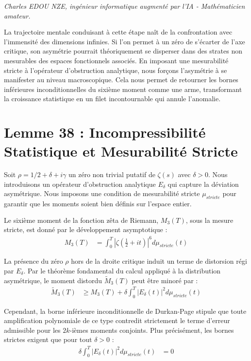\documentclass[
]{article}
\begin{document}
\vspace{1cm}
\begin{flushright}
\textit{Charles EDOU NZE, ingénieur informatique augmenté par l'IA - Mathématicien amateur.}
\end{flushright}


La trajectoire mentale conduisant à cette étape naît de la confrontation avec l'immensité des dimensions infinies. Si l'on permet à un zéro de s'écarter de l'axe critique, son asymétrie pourrait théoriquement se disperser dans des strates non mesurables des espaces fonctionnels associés. En imposant une mesurabilité stricte à l'opérateur d'obstruction analytique, nous forçons l'asymétrie à se manifester au niveau macroscopique. Cela nous permet de retourner les bornes inférieures inconditionnelles du sixième moment comme une arme, transformant la croissance statistique en un filet incontournable qui annule l'anomalie.

\section{Lemme 38 : Incompressibilité Statistique et Mesurabilité Stricte}

Soit $\rho = 1/2 + \delta + i\gamma$ un zéro non trivial putatif de $\zeta(s)$ avec $\delta > 0$. Nous introduisons un opérateur d'obstruction analytique $E_\delta$ qui capture la déviation asymétrique. Nous imposons une condition de mesurabilité stricte $\mu_{stricte}$ pour garantir que les moments soient bien définis sur l'espace entier.

Le sixième moment de la fonction zêta de Riemann, $M_3(T)$, sous la mesure stricte, est donné par le développement asymptotique :
\begin{align*}
    M_3(T) &= \int_0^T \left| \zeta\left(\frac{1}{2} + i t\right) \right|^6 d\mu_{stricte}(t)
\end{align*}

La présence du zéro $\rho$ hors de la droite critique induit un terme de distorsion régi par $E_\delta$. Par le théorème fondamental du calcul appliqué à la distribution asymétrique, le moment distordu $\tilde{M}_3(T)$ peut être minoré par :
\begin{align*}
    \tilde{M}_3(T) &\geq M_3(T) + \delta \int_0^T \left| E_\delta(t) \right|^2 d\mu_{stricte}(t)
\end{align*}

Cependant, la borne inférieure inconditionnelle de Durkan-Page stipule que toute amplification polynomiale de ce type contredit strictement le terme d'erreur admissible pour les $2k$-ièmes moments conjoints. Plus précisément, les bornes strictes exigent que pour tout $\delta > 0$ :
\begin{align*}
    \delta \int_0^T \left| E_\delta(t) \right|^2 d\mu_{stricte}(t) &= 0
\end{align*}
\end{document}
